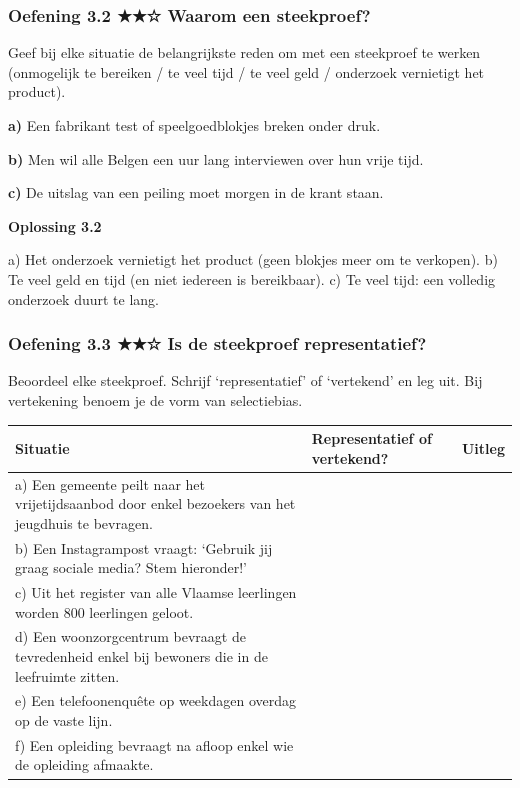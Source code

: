 \subsubsection*{Oefening 3.2 \quad ★★☆ \quad Waarom een steekproef?}

Geef bij elke situatie de belangrijkste reden om met een steekproef te werken (onmogelijk te bereiken / te veel tijd / te veel geld / onderzoek vernietigt het product).

\textbf{a)} Een fabrikant test of speelgoedblokjes breken onder druk. \lijn

\textbf{b)} Men wil alle Belgen een uur lang interviewen over hun vrije tijd. \lijn

\textbf{c)} De uitslag van een peiling moet morgen in de krant staan. \lijn

\begin{oplossing}
\textbf{Oplossing 3.2}

a) Het onderzoek vernietigt het product (geen blokjes meer om te verkopen). b) Te veel geld en tijd (en niet iedereen is bereikbaar). c) Te veel tijd: een volledig onderzoek duurt te lang.
\end{oplossing}

\subsubsection*{Oefening 3.3 \quad ★★☆ \quad Is de steekproef representatief?}

Beoordeel elke steekproef. Schrijf ‘representatief’ of ‘vertekend’ en leg uit. Bij vertekening benoem je de vorm van selectiebias.

\begin{tabular}{lll}
\hline
Situatie & Representatief of vertekend? & Uitleg \\
\hline
a) Een gemeente peilt naar het vrijetijdsaanbod door enkel bezoekers van het jeugdhuis te bevragen. & & \\
b) Een Instagrampost vraagt: ‘Gebruik jij graag sociale media? Stem hieronder!’ & & \\
c) Uit het register van alle Vlaamse leerlingen worden 800 leerlingen geloot. & & \\
d) Een woonzorgcentrum bevraagt de tevredenheid enkel bij bewoners die in de leefruimte zitten. & & \\
e) Een telefoonenquête op weekdagen overdag op de vaste lijn. & & \\
f) Een opleiding bevraagt na afloop enkel wie de opleiding afmaakte. & & \\
\hline
\end{tabular}

